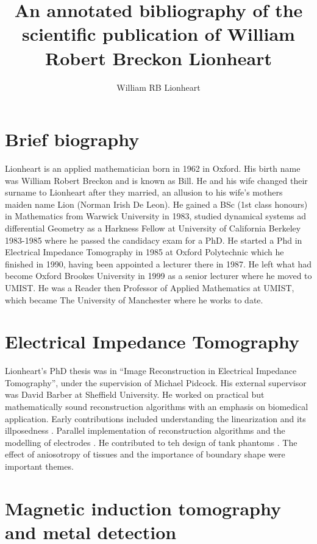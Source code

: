 \documentclass[]{article}
\title{An annotated bibliography of the  scientific publication of William Robert Breckon Lionheart}
\author{William RB Lionheart}
\begin{document}
\maketitle


\section{Brief biography}
Lionheart is an applied mathematician born in 1962 in Oxford. His birth name was William Robert Breckon and is known as Bill. He and his wife changed their surname to Lionheart after they married, an allusion to his wife's mothers maiden name Lion (Norman Irish De Leon).  He gained a BSc (1st class honours) in Mathematics from Warwick University in 1983, studied dynamical systems ad differential Geometry as a Harkness Fellow at University of California Berkeley 1983-1985 where he passed the candidacy exam for a PhD. He started a Phd in Electrical Impedance Tomography in 1985 at Oxford Polytechnic which he finished in 1990, having been appointed a lecturer there in 1987.  He left what had become Oxford Brookes University in 1999 as a senior lecturer where he moved to UMIST. He was a Reader then Professor of Applied Mathematics at UMIST, which became The University of Manchester where he works to date.

\section{Electrical Impedance Tomography}

Lionheart's PhD thesis was in ``Image Reconstruction in Electrical Impedance Tomography''\cite{breckon1990image}, under the supervision of Michael Pidcock. His external supervisor was David Barber at Sheffield University. He worked on practical but mathematically sound reconstruction algorithms with an emphasis on biomedical application. Early contributions included understanding the linearization and its illposedness \cite{breckon1988ill} \cite{breckon1988progress} \cite{breckon1988data}. Parallel implementation of reconstruction algorithms \cite{breckon1990parallelism} and the modelling of electrodes \cite{paulson1992electrode}. He contributed to teh design of tank phantoms \cite{paulson1992hybrid}. The effect of  aniosotropy of tissues \cite{breckon1992problem}  and the importance of boundary shape were important themes. 


\section{Magnetic induction tomography and metal detection}
\end{document}
